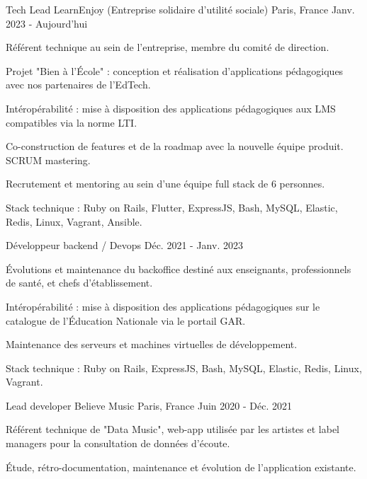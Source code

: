 \begin{cventries}
  \cventry
    {Tech Lead}
    {LearnEnjoy (Entreprise solidaire d'utilité sociale)}
    {Paris, France}
    {Janv. 2023 - Aujourd'hui}
    {
      \begin{cvitems}
        \item {Référent technique au sein de l'entreprise, membre du comité de direction.}
        \item {Projet "Bien à l'École" : conception et réalisation d'applications pédagogiques avec nos partenaires de l'EdTech.}
        \item {Intéropérabilité : mise à disposition des applications pédagogiques aux LMS compatibles via la norme LTI.}
        \item {Co-construction de features et de la roadmap avec la nouvelle équipe produit. SCRUM mastering.}
        \item {Recrutement et mentoring au sein d'une équipe full stack de 6 personnes.}
        \item {Stack technique : Ruby on Rails, Flutter, ExpressJS, Bash, MySQL, Elastic, Redis, Linux, Vagrant, Ansible.}
      \end{cvitems}
      \vspace{-2.0mm}
    }
  \cventry
    {Développeur backend / Devops}
    {}
    {}
    {Déc. 2021 - Janv. 2023}
    {
      \begin{cvitems}
        \item {Évolutions et maintenance du backoffice destiné aux enseignants, professionnels de santé, et chefs d'établissement.}
        \item {Intéropérabilité : mise à disposition des applications pédagogiques sur le catalogue de l'Éducation Nationale via le portail GAR.}
        \item {Maintenance des serveurs et machines virtuelles de développement.}
        \item {Stack technique : Ruby on Rails, ExpressJS, Bash, MySQL, Elastic, Redis, Linux, Vagrant.}
      \end{cvitems}
    }
  \cventry
    {Lead developer}
    {Believe Music}
    {Paris, France}
    {Juin 2020 - Déc. 2021}
    {
      \begin{cvitems}
        \item {Référent technique de "Data Music", web-app utilisée par les artistes et label managers pour la consultation de données d'écoute.}
        \item {Étude, rétro-documentation, maintenance et évolution de l'application existante.}

\end{cvitems}}
\end{cventries}
